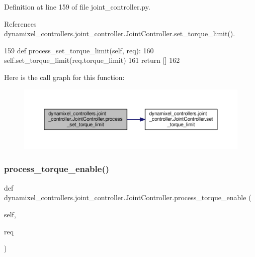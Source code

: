 Definition at line 159 of file joint\+\_\+controller.\+py.



References dynamixel\+\_\+controllers.\+joint\+\_\+controller.\+Joint\+Controller.\+set\+\_\+torque\+\_\+limit().


\begin{DoxyCode}
159     \textcolor{keyword}{def }process\_set\_torque\_limit(self, req):
160         self.set\_torque\_limit(req.torque\_limit)
161         \textcolor{keywordflow}{return} []
162 
\end{DoxyCode}
Here is the call graph for this function\+:
\nopagebreak
\begin{figure}[H]
\begin{center}
\leavevmode
\includegraphics[width=350pt]{d3/dcd/classdynamixel__controllers_1_1joint__controller_1_1_joint_controller_aa199ce6ae353ed44fe71ae96a5da242d_cgraph}
\end{center}
\end{figure}
\mbox{\label{classdynamixel__controllers_1_1joint__controller_1_1_joint_controller_a2181fcf467234ed09e378a93ea5a0553}} 
\subsubsection{\texorpdfstring{process\+\_\+torque\+\_\+enable()}{process\_torque\_enable()}}
{\footnotesize\ttfamily def dynamixel\+\_\+controllers.\+joint\+\_\+controller.\+Joint\+Controller.\+process\+\_\+torque\+\_\+enable (\begin{DoxyParamCaption}\item[{}]{self,  }\item[{}]{req }\end{DoxyParamCaption})\hspace{0.3cm}{\ttfamily [inherited]}}



